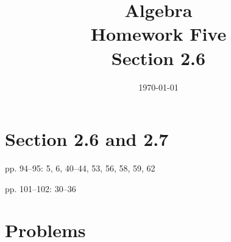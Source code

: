 \documentclass[letterpaper, landscape]{exam}
\title{Algebra \\ Homework Five \\ Section 2.6 }
\author{}
\date{\today}
\begin{document}
  \maketitle

  \section{Section 2.6 and 2.7}
  \begin{itemize*}
    \item pp. 94--95: 5, 6, 40--44, 53, 56, 58, 59, 62
    \item pp. 101--102: 30--36
  \end{itemize*}

  \section{Problems}
\end{document}
